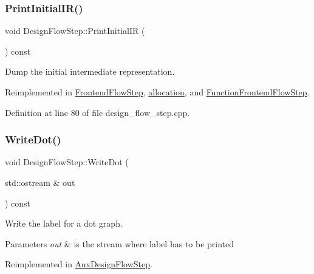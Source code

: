 \subsubsection{\texorpdfstring{Print\+Initial\+I\+R()}{PrintInitialIR()}}
{\footnotesize\ttfamily void Design\+Flow\+Step\+::\+Print\+Initial\+IR (\begin{DoxyParamCaption}{ }\end{DoxyParamCaption}) const\hspace{0.3cm}{\ttfamily [virtual]}}



Dump the initial intermediate representation. 



Reimplemented in \hyperlink{classFrontendFlowStep_aa4082589c5838cc22e2b4ea7097b5c16}{Frontend\+Flow\+Step}, \hyperlink{classallocation_aa977c26d2952e7fc0e7f09037c540bd3}{allocation}, and \hyperlink{classFunctionFrontendFlowStep_a65cf8273a7a4f4bc3ed85c04220349ad}{Function\+Frontend\+Flow\+Step}.



Definition at line 80 of file design\+\_\+flow\+\_\+step.\+cpp.

\mbox{\label{classDesignFlowStep_a1562bb503d9b9f2a2a059041d79043c6}} 
\subsubsection{\texorpdfstring{Write\+Dot()}{WriteDot()}}
{\footnotesize\ttfamily void Design\+Flow\+Step\+::\+Write\+Dot (\begin{DoxyParamCaption}\item[{std\+::ostream \&}]{out }\end{DoxyParamCaption}) const\hspace{0.3cm}{\ttfamily [virtual]}}



Write the label for a dot graph. 


\begin{DoxyParams}{Parameters}
{\em out} & is the stream where label has to be printed \\
\hline
\end{DoxyParams}


Reimplemented in \hyperlink{classAuxDesignFlowStep_acb3ca20dd02fa5e910b22c19a4d5f9c6}{Aux\+Design\+Flow\+Step}.



